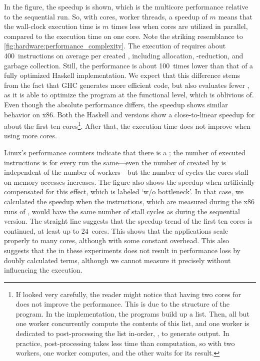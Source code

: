 In the figure, the speedup is shown, which is the multicore performance relative to the sequential run.
So, with \SYMcorecount cores, \ie worker threads, a speedup of $m$ means that the wall-clock execution time is $m$ times less when \SYMcorecount cores are utilized in parallel, compared to the execution time on one core.
Note the striking resemblance to \vref{fig:hardware:performance_complexity}.
The execution of \ourfp requires about 400~instructions on average per created \lterm, including allocation, \fxbeta-reduction, and garbage collection.
Still, the performance is about 100~times lower than that of a fully optimized Haskell implementation.
We expect that this difference stems from the fact that \ac{GHC} generates more efficient code, but also evaluates fewer \lterms, as it is able to optimize the program at the functional level, which  is oblivious of.
Even though the absolute performance differs, the speedup shows similar behavior on x86.
Both the Haskell and \ourfp versions show a close-to-linear speedup for about the first ten cores\footnote{%
	If looked very carefully, the reader might notice that having two cores for \ourfp does not improve the performance.
	This is due to the structure of the program.
	In the implementation, the programs build up a list.
	Then, all but one worker concurrently compute the contents of this list, and one worker is dedicated to post-processing the list in-order, \eg, to generate output.
	In practice, post-processing takes less time than computation, so with two workers, one worker computes, and the other waits for its result.
}.
After that, the execution time does not improve when using more cores.

Linux's  performance counters indicate that there is a ; the number of executed instructions is for every run the same---even the number of created \lterms by \ourfp is independent of the number of workers---but the number of cycles the cores stall on memory accesses increases.
The figure also shows the speedup when artificially compensated for this effect, which is labeled `w/o bottleneck'.
In that case, we calculated the speedup when the instructions, which are measured during the x86 runs of \ourfp, would have the same number of stall cycles as during the sequential version.
The straight line suggests that the speedup trend of the first ten cores is continued, at least up to 24~cores.
This shows that the applications scale properly to many cores, although with some constant overhead.
This also suggests that the  in these experiments does not result in performance loss by doubly calculated terms, although we cannot measure it precisely without influencing the execution.

